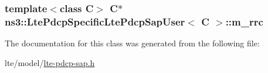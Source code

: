 \subsubsection[{\texorpdfstring{m\+\_\+rrc}{m_rrc}}]{\setlength{\rightskip}{0pt plus 5cm}template$<$class C$>$ {\bf C}$\ast$ {\bf ns3\+::\+Lte\+Pdcp\+Specific\+Lte\+Pdcp\+Sap\+User}$<$ {\bf C} $>$\+::m\+\_\+rrc\hspace{0.3cm}{\ttfamily [private]}}\hypertarget{classns3_1_1LtePdcpSpecificLtePdcpSapUser_a50ced7b58fdf4d695db63332ae85dbc0}{}\label{classns3_1_1LtePdcpSpecificLtePdcpSapUser_a50ced7b58fdf4d695db63332ae85dbc0}


The documentation for this class was generated from the following file\+:\begin{DoxyCompactItemize}
\item 
lte/model/\hyperlink{lte-pdcp-sap_8h}{lte-\/pdcp-\/sap.\+h}\end{DoxyCompactItemize}

